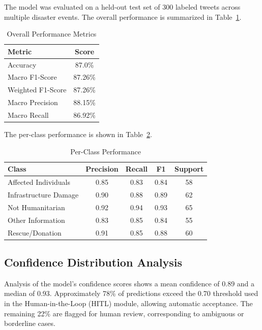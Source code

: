 \documentclass[pdflatex,sn-mathphys-num]{sn-jnl}%
\theoremstyle{thmstyleone}%
\theoremstyle{thmstyletwo}%
\theoremstyle{thmstylethree}%
\begin{document}
The model was evaluated on a held-out test set of 300 labeled tweets across multiple disaster events. The overall performance is summarized in Table~\ref{tab:overall_metrics}.

\begin{table}[h]
\centering
\caption{Overall Performance Metrics}
\label{tab:overall_metrics}
\begin{tabular}{|l|c|}
\hline
\textbf{Metric} & \textbf{Score} \\
\hline
Accuracy & 87.0\% \\
Macro F1-Score & 87.26\% \\
Weighted F1-Score & 87.26\% \\
Macro Precision & 88.15\% \\
Macro Recall & 86.92\% \\
\hline
\end{tabular}
\end{table}

The per-class performance is shown in Table~\ref{tab:class_metrics}.

\begin{table}[h]
\centering
\caption{Per-Class Performance}
\label{tab:class_metrics}
\begin{tabular}{|l|c|c|c|c|}
\hline
\textbf{Class} & \textbf{Precision} & \textbf{Recall} & \textbf{F1} & \textbf{Support} \\
\hline
Affected Individuals & 0.85 & 0.83 & 0.84 & 58 \\
Infrastructure Damage & 0.90 & 0.88 & 0.89 & 62 \\
Not Humanitarian & 0.92 & 0.94 & 0.93 & 65 \\
Other Information & 0.83 & 0.85 & 0.84 & 55 \\
Rescue/Donation & 0.91 & 0.85 & 0.88 & 60 \\
\hline
\end{tabular}
\end{table}

\subsection{Confidence Distribution Analysis}

Analysis of the model's confidence scores shows a mean confidence of 0.89 and a median of 0.93. Approximately 78\% of predictions exceed the 0.70 threshold used in the Human-in-the-Loop (HITL) module, allowing automatic acceptance. The remaining 22\% are flagged for human review, corresponding to ambiguous or borderline cases.
\end{document}
